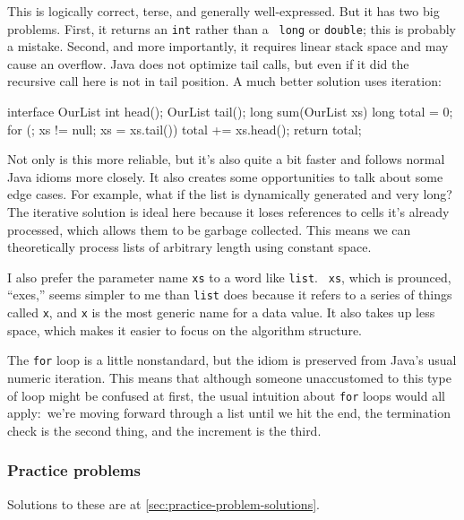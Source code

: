 \documentclass{article}
\begin{document}
      This is logically correct, terse, and generally well-expressed. But it
      has two big problems. First, it returns an {\tt int} rather than a {\tt
      long} or {\tt double}; this is probably a mistake. Second, and more
      importantly, it requires linear stack space and may cause an overflow.
      Java does not optimize tail calls, but even if it did the recursive call
      here is not in tail position. A much better solution uses iteration:

\begin{javacode}
interface OurList {
  int head();
  OurList tail();
}
long sum(OurList xs) {
  long total = 0;
  for (; xs != null; xs = xs.tail())
    total += xs.head();
  return total;
} \end{javacode}

      Not only is this more reliable, but it's also quite a bit faster and
      follows normal Java idioms more closely. It also creates some
      opportunities to talk about some edge cases. For example, what if the
      list is dynamically generated and very long? The iterative solution is
      ideal here because it loses references to cells it's already processed,
      which allows them to be garbage collected. This means we can
      theoretically process lists of arbitrary length using constant space.

      I also prefer the parameter name {\tt xs} to a word like {\tt list}. {\tt
      xs}, which is prounced, ``exes,'' seems simpler to me than {\tt list}
      does because it refers to a series of things called {\tt x}, and {\tt x}
      is the most generic name for a data value. It also takes up less space,
      which makes it easier to focus on the algorithm structure.

      The {\tt for} loop is a little nonstandard, but the idiom is preserved
      from Java's usual numeric iteration. This means that although someone
      unaccustomed to this type of loop might be confused at first, the usual
      intuition about {\tt for} loops would all apply:~we're moving forward
      through a list until we hit the end, the termination check is the second
      thing, and the increment is the third.

\subsubsection{Practice problems}
      Solutions to these are at \ref{sec:practice-problem-solutions}.
\end{document}
